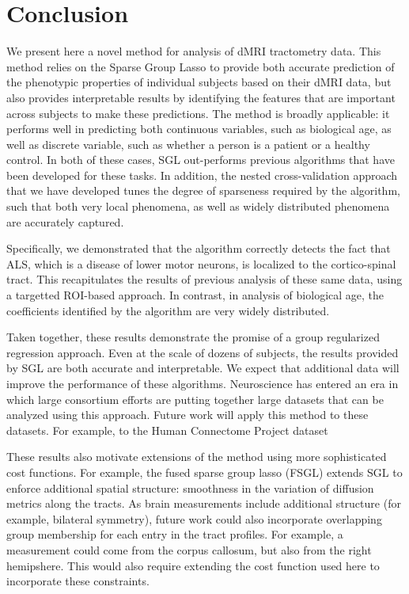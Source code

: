 \section*{Conclusion}

We present here a novel method for analysis of dMRI tractometry data. This
method relies on the Sparse Group Lasso \cite{simon2013sparse} to provide both
accurate prediction of the phenotypic properties of individual subjects based on
their dMRI data, but also provides interpretable results by identifying the
features that are important across subjects to make these predictions. The
method is broadly applicable: it performs well in predicting both continuous
variables, such as biological age, as well as discrete variable, such as whether
a person is a patient or a healthy control. In both of these cases, SGL
out-performs previous algorithms that have been developed for these tasks. In
addition, the nested cross-validation approach that we have developed tunes the
degree of sparseness required by the algorithm, such that both very local
phenomena, as well as widely distributed phenomena are accurately captured.

Specifically, we demonstrated that the algorithm correctly detects the fact that
 ALS, which is a disease of lower motor neurons, is localized to the
 cortico-spinal tract. This recapitulates the results of previous analysis of
 these same data, using a targetted ROI-based approach. In contrast, in analysis
 of biological age, the coefficients identified by the algorithm are very widely
 distributed.

Taken together, these results demonstrate the promise of a group regularized
regression approach. Even at the scale of dozens of subjects, the results
provided by SGL are both accurate and interpretable. We expect that additional
data will improve the performance of these algorithms. Neuroscience has entered
an era in which large consortium efforts are putting together large datasets
that can be analyzed using this approach. Future work will apply this method to
these datasets. For example, to the Human Connectome Project dataset
\cite{VanEssen2012}

These results also motivate extensions of the method using more sophisticated
cost functions. For example, the fused sparse group lasso (FSGL)
\cite{zhou2012} extends SGL to enforce additional spatial structure: smoothness
in the variation of diffusion metrics along the tracts. As brain measurements
include additional structure (for example, bilateral symmetry), future work
could also incorporate overlapping group membership for each entry in the tract
profiles. For example, a measurement could come from the corpus callosum, but
also from the right hemipshere. This would also require extending the cost
function used here to incorporate these constraints.


